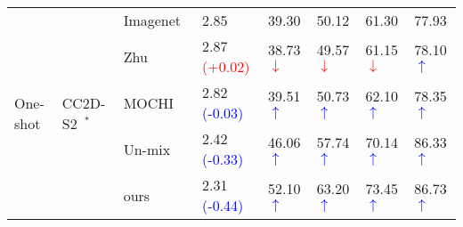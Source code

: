 \documentclass[10pt,twocolumn,letterpaper]{article}
\begin{document}
\begin{table*}[t]
\begin{threeparttable}
\begin{tabular}{l|l|l|lllll}
\multirow{5}{*}{One-shot} & \multirow{5}{*}{CC2D-S2~\cite{yao2021one}$^*$} & Imagenet~\cite{DBLP:conf/cvpr/DengDSLL009} & 2.85 & 39.30 & 50.12 & 61.30 & 77.93 \\
 & & Zhu~\cite{zhu2021improving}  & 2.87 \textcolor{red}{(+0.02)} & 38.73\textcolor{red}{$\downarrow$} & 49.57\textcolor{red}{$\downarrow$} & 61.15\textcolor{red}{$\downarrow$} & 78.10\textcolor{blue}{$\uparrow$}\\
 & & MOCHI~\cite{kalantidis2020hard}  & 2.82 \textcolor{blue}{(-0.03)}  & 39.51\textcolor{blue}{$\uparrow$} & 50.73\textcolor{blue}{$\uparrow$} & 62.10\textcolor{blue}{$\uparrow$} & 78.35\textcolor{blue}{$\uparrow$} \\
 & & Un-mix~\cite{shen2022mix} & 2.42 \textcolor{blue}{(-0.33)} & 46.06\textcolor{blue}{$\uparrow$} & 57.74\textcolor{blue}{$\uparrow$} & 70.14\textcolor{blue}{$\uparrow$} & 86.33\textcolor{blue}{$\uparrow$} \\
& & ours  & 2.31 \textcolor{blue}{(-0.44)} & 52.10\textcolor{blue}{$\uparrow$} & 63.20\textcolor{blue}{$\uparrow$} & 73.45\textcolor{blue}{$\uparrow$} & 86.73\textcolor{blue}{$\uparrow$} \\
\hline
\hline


\end{tabular}
\end{threeparttable}
\end{table*}
\end{document}
